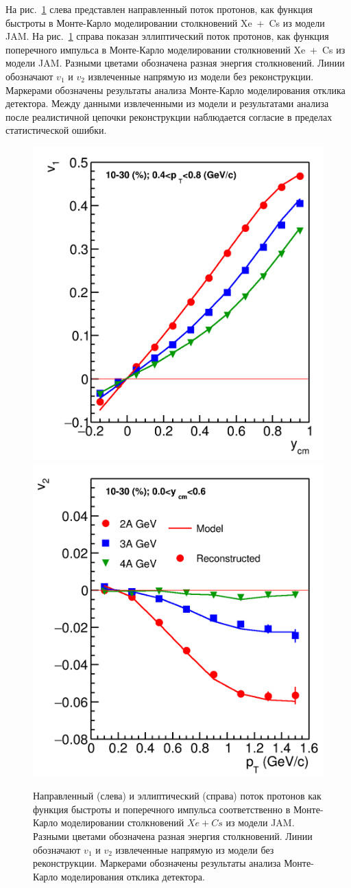 На рис.~\ref{fig:bmn_v1_v2} слева представлен направленный поток протонов, как функция быстроты в Монте-Карло моделировании столкновений Xe~+~Cs из модели JAM. 
На рис.~\ref{fig:bmn_v1_v2} справа показан эллиптический поток протонов, как функция поперечного импульса в Монте-Карло моделировании столкновений Xe~+~Cs из модели JAM. 
Разными цветами обозначена разная энергия столкновений. 
Линии обозначают $v_1$ и $v_2$ извлеченные напрямую из модели без реконструкции. 
Маркерами обозначены результаты анализа Монте-Карло моделирования отклика детектора.
Между данными извлеченными из модели и результатами анализа после реалистичной цепочки реконструкции наблюдается согласие в пределах статистической ошибки. 
%
\begin{figure}[ht]
\begin{center}
\includegraphics[width=0.45\linewidth]{images/v1_proton_tof_rapidity.png}
\includegraphics[width=0.45\linewidth]{images/v2_proton_tof_pT.png}
\caption{ 
    Направленный (слева) и эллиптический (справа) поток протонов как функция быстроты и поперечного импульса соответственно в Монте-Карло моделировании столкновений $Xe+Cs$ из модели JAM. Разными цветами обозначена разная энергия столкновений. Линии обозначают $v_1$ и $v_2$ извлеченные напрямую из модели без реконструкции. Маркерами обозначены результаты анализа Монте-Карло моделирования отклика детектора.
}
\label{fig:bmn_v1_v2}
\end{center}
\end{figure}

